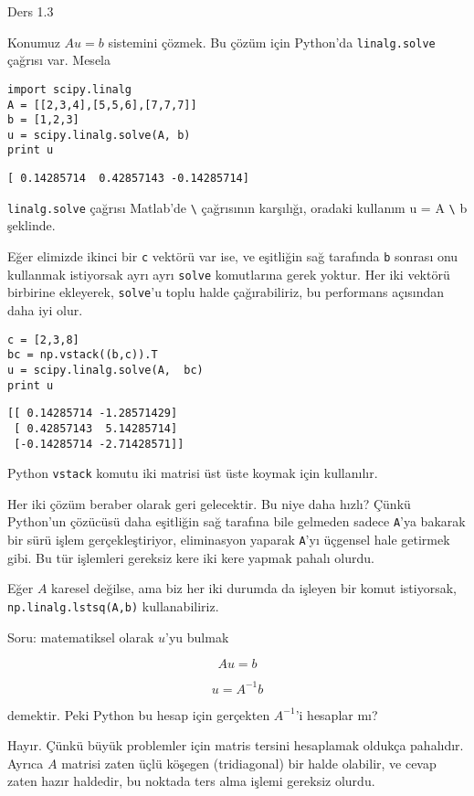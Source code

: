 \documentclass[12pt,fleqn]{article}\usepackage{../../common}
\begin{document}
Ders 1.3

Konumuz $Au = b$ sistemini çözmek. Bu çözüm için Python'da
\verb!linalg.solve! çağrısı var. Mesela

\begin{verbatim}
import scipy.linalg
A = [[2,3,4],[5,5,6],[7,7,7]]
b = [1,2,3]
u = scipy.linalg.solve(A, b)
print u
\end{verbatim}

\begin{verbatim}
[ 0.14285714  0.42857143 -0.14285714]
\end{verbatim}

\verb!linalg.solve! çağrısı Matlab'de \verb!\! çağrısının karşılığı,
oradaki kullanım u = A \verb!\! b şeklinde. 

Eğer elimizde ikinci bir \verb!c! vektörü var ise, ve eşitliğin sağ
tarafında \verb!b! sonrası onu kullanmak istiyorsak ayrı ayrı \verb!solve!
komutlarına gerek yoktur. Her iki vektörü birbirine ekleyerek,
\verb!solve!'u toplu halde çağırabiliriz, bu performans açısından daha iyi
olur. 

\begin{verbatim}
c = [2,3,8]
bc = np.vstack((b,c)).T
u = scipy.linalg.solve(A,  bc)
print u
\end{verbatim}

\begin{verbatim}
[[ 0.14285714 -1.28571429]
 [ 0.42857143  5.14285714]
 [-0.14285714 -2.71428571]]
\end{verbatim}

Python \verb!vstack! komutu iki matrisi üst üste koymak için kullanılır.

Her iki çözüm beraber olarak geri gelecektir. Bu niye daha hızlı? Çünkü
Python'un çözücüsü daha eşitliğin sağ tarafına bile gelmeden sadece
\verb!A!'ya bakarak bir sürü işlem gerçekleştiriyor, eliminasyon yaparak
\verb!A!'yı üçgensel hale getirmek gibi. Bu tür işlemleri gereksiz kere iki
kere yapmak pahalı olurdu.

Eğer $A$ karesel değilse, ama biz her iki durumda da işleyen bir komut
istiyorsak, \verb!np.linalg.lstsq(A,b)! kullanabiliriz. 

Soru: matematiksel olarak $u$'yu bulmak 

$$ Au = b $$

$$ u = A^{-1}b $$

demektir. Peki Python bu hesap için gerçekten $A^{-1}$'i hesaplar mı?

Hayır. Çünkü büyük problemler için matris tersini hesaplamak oldukça
pahalıdır. Ayrıca $A$ matrisi zaten üçlü köşegen (tridiagonal) bir halde
olabilir, ve cevap zaten hazır haldedir, bu noktada ters alma işlemi
gereksiz olurdu. 
\end{document}
